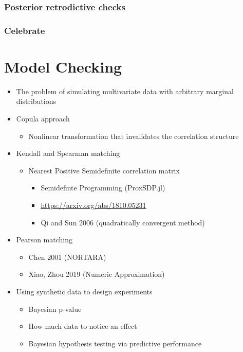 \documentclass[11pt, oneside]{book}
\providecommand{\tightlist}{%
  \setlength{\itemsep}{0pt}\setlength{\parskip}{0pt}}
\begin{document}
\hypertarget{posterior-retrodictive-checks}{%
\subsection{Posterior retrodictive checks}\label{posterior-retrodictive-checks}}

\hypertarget{celebrate}{%
\subsection{Celebrate}\label{celebrate}}

\hypertarget{model-checking}{%
\chapter{Model Checking}\label{model-checking}}

\begin{itemize}
\tightlist
\item
  The problem of simulating multivariate data with arbitrary marginal distributions
\item
  Copula approach

  \begin{itemize}
  \tightlist
  \item
    Nonlinear transformation that invalidates the correlation structure
  \end{itemize}
\item
  Kendall and Spearman matching

  \begin{itemize}
  \tightlist
  \item
    Nearest Positive Semidefinite correlation matrix

    \begin{itemize}
    \tightlist
    \item
      Semidefinte Programming (ProxSDP.jl)
    \item
      \url{https://arxiv.org/abs/1810.05231}
    \item
      Qi and Sun 2006 (quadratically convergent method)
    \end{itemize}
  \end{itemize}
\item
  Pearson matching

  \begin{itemize}
  \tightlist
  \item
    Chen 2001 (NORTARA)
  \item
    Xiao, Zhou 2019 (Numeric Approximation)
  \end{itemize}
\item
  Using synthetic data to design experiments

  \begin{itemize}
  \tightlist
  \item
    Bayesian p-value
  \item
    How much data to notice an effect
  \item
    Bayesian hypothesis testing via predictive performance
  \end{itemize}
\end{itemize}
\end{document}
